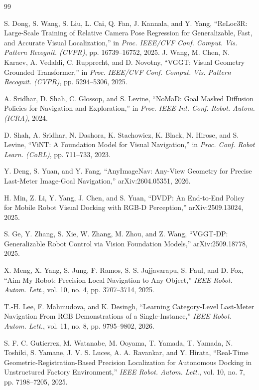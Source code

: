 \documentclass[letterpaper, 10 pt, conference]{IEEEtran}  %
\begin{document}
\begin{thebibliography}{99}

 S. Dong, S. Wang, S. Liu, L. Cai, Q. Fan, J. Kannala, and Y. Yang, ``ReLoc3R: Large-Scale Training of Relative Camera Pose Regression for Generalizable, Fast, and Accurate Visual Localization,'' in \emph{Proc. IEEE/CVF Conf. Comput. Vis. Pattern Recognit. (CVPR)}, pp. 16739--16752, 2025.
 J. Wang, M. Chen, N. Karaev, A. Vedaldi, C. Rupprecht, and D. Novotny, ``VGGT: Visual Geometry Grounded Transformer,'' in \emph{Proc. IEEE/CVF Conf. Comput. Vis. Pattern Recognit. (CVPR)}, pp. 5294--5306, 2025.

 A. Sridhar, D. Shah, C. Glossop, and S. Levine, ``NoMaD: Goal Masked Diffusion Policies for Navigation and Exploration,'' in \emph{Proc. IEEE Int. Conf. Robot. Autom. (ICRA)}, 2024.

 D. Shah, A. Sridhar, N. Dashora, K. Stachowicz, K. Black, N. Hirose, and S. Levine, ``ViNT: A Foundation Model for Visual Navigation,'' in \emph{Proc. Conf. Robot Learn. (CoRL)}, pp. 711--733, 2023.

 Y. Deng, S. Yuan, and Y. Fang, ``AnyImageNav: Any-View Geometry for Precise Last-Meter Image-Goal Navigation,'' arXiv:2604.05351, 2026.

 H. Min, Z. Li, Y. Yang, J. Chen, and S. Yuan, ``DVDP: An End-to-End Policy for Mobile Robot Visual Docking with RGB-D Perception,'' arXiv:2509.13024, 2025.

 S. Ge, Y. Zhang, S. Xie, W. Zhang, M. Zhou, and Z. Wang, ``VGGT-DP: Generalizable Robot Control via Vision Foundation Models,'' arXiv:2509.18778, 2025.

 X. Meng, X. Yang, S. Jung, F. Ramos, S. S. Jujjavarapu, S. Paul, and D. Fox, ``Aim My Robot: Precision Local Navigation to Any Object,'' \emph{IEEE Robot. Autom. Lett.}, vol. 10, no. 4, pp. 3707--3714, 2025.

 T.-H. Lee, F. Mahmudova, and K. Desingh, ``Learning Category-Level Last-Meter Navigation From RGB Demonstrations of a Single-Instance,'' \emph{IEEE Robot. Autom. Lett.}, vol. 11, no. 8, pp. 9795--9802, 2026.

 S. F. C. Gutierrez, M. Watanabe, M. Ooyama, T. Yamada, T. Yamada, N. Toshiki, S. Yamane, J. V. S. Luces, A. A. Ravankar, and Y. Hirata, ``Real-Time Geometric-Registration-Based Precision Localization for Autonomous Docking in Unstructured Factory Environment,'' \emph{IEEE Robot. Autom. Lett.}, vol. 10, no. 7, pp. 7198--7205, 2025.


\end{thebibliography}
\end{document}

